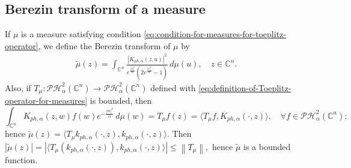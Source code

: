\documentclass[10pt,leqno]{amsart}
\theoremstyle{remark}
\numberwithin{equation}{section}
\newcommand{\hph}{\mathcal{PH}_\alpha^2(\mathbb{C}^n)}%
\newcommand{\Kph}{K_{ph,\alpha}}%
\newcommand{\kph}{k_{ph,\alpha}}%
\begin{document}
\subsection{Berezin transform of a measure}
If $\mu$ is a measure satisfying condition \eqref{eq:condition-for-measures-for-toeplitz-operator}, we define the Berezin transform of $\mu$ by
\begin{align*}
	\widetilde{\mu}(z)= \int_{\mathbb{C}^{n}}^{}\frac{\left| \Kph(z,u) \right| ^2}{e^{\frac{|u|^2}{\alpha}}\left( 2e^{\frac{|z|^2}{\alpha}}-1 \right) }\, d\mu(u),\quad z \in \mathbb{C}^{n}.
\end{align*}
Also, if $T_\mu : \hph \to \hph$ defined with \eqref{eq:definition-of-Toeplitz-operator-for-measures} is bounded, then
\[
	\int_{\mathbb{C}^{n}}^{}\Kph (z,w) f(w) e^{-\frac{|w|^2}{\alpha}}\, d\mu(w) = T_\mu f(z)= \langle T_\mu f,\Kph(\cdot,z) \rangle, \quad \forall f \in \hph;
\]
hence
\(
\widetilde{\mu}(z)=\langle T_\mu \kph(\cdot,z),\kph(\cdot,z) \rangle.
\)
Then  $|\widetilde{\mu}(z)|=|\langle T_\mu\left( \kph(\cdot,z) \right) ,\kph(\cdot,z) \rangle| \leq \left\lVert T_{\mu} \right\rVert,$ hence $\widetilde{\mu}$ is a bounded function.
\end{document}
